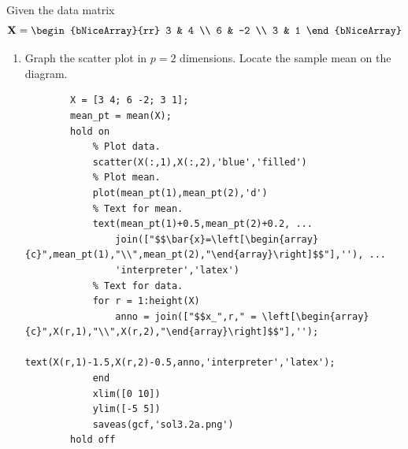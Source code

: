 Given the data matrix
\[
    \textbf{X}
    =
    \begin{bNiceArray}{rr}
        3 & 4 \\
        6 & -2 \\
        3 & 1
    \end{bNiceArray}
\]
\begin{enumerate}[label=(\alph*)]
    \item Graph the scatter plot in $p=2$ dimensions. Locate the sample mean on the diagram.
    \begin{lstlisting}
        X = [3 4; 6 -2; 3 1];
        mean_pt = mean(X);
        hold on
            % Plot data.
            scatter(X(:,1),X(:,2),'blue','filled')
            % Plot mean.
            plot(mean_pt(1),mean_pt(2),'d')
            % Text for mean.
            text(mean_pt(1)+0.5,mean_pt(2)+0.2, ...
                join(["$$\bar{x}=\left[\begin{array}{c}",mean_pt(1),"\\",mean_pt(2),"\end{array}\right]$$"],''), ...
                'interpreter','latex')
            % Text for data.
            for r = 1:height(X)
                anno = join(["$$x_",r," = \left[\begin{array}{c}",X(r,1),"\\",X(r,2),"\end{array}\right]$$"],'');
                text(X(r,1)-1.5,X(r,2)-0.5,anno,'interpreter','latex');
            end
            xlim([0 10])
            ylim([-5 5])
            saveas(gcf,'sol3.2a.png')
        hold off
    \end{lstlisting}


\end{enumerate}

